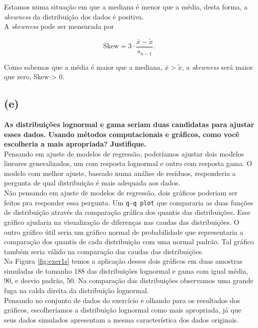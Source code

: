\documentclass[12pt, oldfontcommands]{article}\usepackage[]{graphicx}\usepackage[]{color}
\begin{document}
\quad
Estamos numa situação em que a mediana é menor que a média, desta forma, a
\textit{skewness} da distribuição dos dados é positiva. \\
A \textit{skewness} pode ser mensurada por

\[ \text{Skew} = 3 \cdot \frac{\bar{x} - \tilde{x}}{s_{n-1}}. \]

Como sabemos que a média é maior que a mediana, \(\bar{x} > \tilde{x}\), a
\textit{skewness} será maior que zero, Skew > 0.

\subsection*{(e)} 

\textbf{As distribuições lognormal e gama seriam duas candidatas para
        ajustar esses dados. Usando métodos computacionais e gráficos,
        como você escolheria a mais apropriada? Justifique.} \\

\quad
Pensando em ajuste de modelos de regressão, poderíamos ajustar dois
modelos lineares generalizados, um com resposta lognormal e outro com
resposta gama. O modelo com melhor ajuste, baseado numa análise de
resíduos, responderia a pergunta de qual distribuição é mais adequada aos
dados. \\

Não pensando em ajuste de modelos de regressão, dois gráficos poderiam ser
feitos pra responder essa pergunta. Um \texttt{q-q plot} que compararia as
duas funções de distribuição através da comparação gráfica dos quantis das
distribuições. Esse gráfico ajudaria na visualização de diferenças nas
caudas das distribuições. O outro gráfico útil seria um gráfico normal de
probabilidade que representaria a comparação dos quantis de cada
distribuição com uma normal padrão. Tal gráfico também seria válido na
comparação das caudas das distribuições. \\

Na Figura \ref{fig:exer1s} temos a aplicação desses dois gráficos em duas
amostras simuladas de tamanho 188 das distribuições lognormal e gama com
igual média, 90, e desvio padrão, 50. Na comparação das distribuições
observamos uma grande fuga na calda direita da distribuição lognormal. \\

Pensando no conjunto de dados do exercício e olhando para os resultados
dos gráficos, escolheríamos a distribuição lognormal como mais apropriada,
já que seus dados simulados apresentam a mesma característica dos dados
originais.
\end{document}
